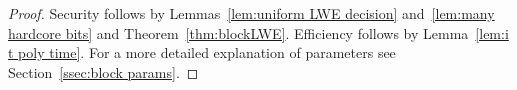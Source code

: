 \documentclass[11pt]{article}
\newcommand{\secref}[1]{\mbox{Section~\ref{#1}}}
\newcommand{\thref}[1]{\mbox{Theorem~\ref{#1}}}
\newcommand{\lemref}[1]{\mbox{Lemma~\ref{#1}}}
\begin{document}
\begin{proof} Security follows by Lemmas~\ref{lem:uniform LWE decision} and~\ref{lem:many hardcore bits} and  \thref{thm:blockLWE}.  Efficiency follows by \lemref{lem:i t poly time}.  For a more detailed explanation of parameters see \secref{ssec:block params}.
\end{proof}

\end{document}
